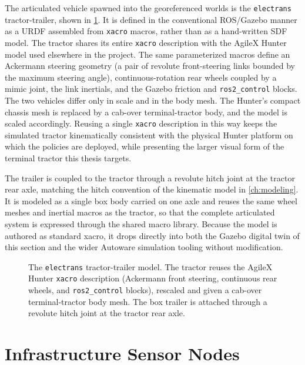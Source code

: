 The articulated vehicle spawned into the georeferenced worlds is the \texttt{electrans} tractor-trailer, shown in \cref{fig:electrans_model}. It is defined in the conventional ROS/Gazebo manner as a URDF assembled from \texttt{xacro} macros, rather than as a hand-written SDF model. The tractor shares its entire \texttt{xacro} description with the AgileX Hunter model used elsewhere in the project. The same parameterized macros define an Ackermann steering geometry (a pair of revolute front-steering links bounded by the maximum steering angle), continuous-rotation rear wheels coupled by a mimic joint, the link inertials, and the Gazebo friction and \texttt{ros2\_control} blocks. The two vehicles differ only in scale and in the body mesh. The Hunter's compact chassis mesh is replaced by a cab-over terminal-tractor body, and the model is scaled accordingly. Reusing a single \texttt{xacro} description in this way keeps the simulated tractor kinematically consistent with the physical Hunter platform on which the policies are deployed, while presenting the larger visual form of the terminal tractor this thesis targets.

The trailer is coupled to the tractor through a revolute hitch joint at the tractor rear axle, matching the hitch convention of the kinematic model in \cref{ch:modeling}. It is modeled as a single box body carried on one axle and reuses the same wheel meshes and inertial macros as the tractor, so that the complete articulated system is expressed through the shared macro library. Because the model is authored as standard xacro, it drops directly into both the Gazebo digital twin of this section and the wider Autoware simulation tooling without modification.

\begin{figure}[H]
    \centering
    \caption{The \texttt{electrans} tractor-trailer model. The tractor reuses the AgileX Hunter \texttt{xacro} description (Ackermann front steering, continuous rear wheels, and \texttt{ros2\_control} blocks), rescaled and given a cab-over terminal-tractor body mesh. The box trailer is attached through a revolute hitch joint at the tractor rear axle.}
    \label{fig:electrans_model}
\end{figure}

\section{Infrastructure Sensor Nodes}
\label{sec:sensor_nodes}

